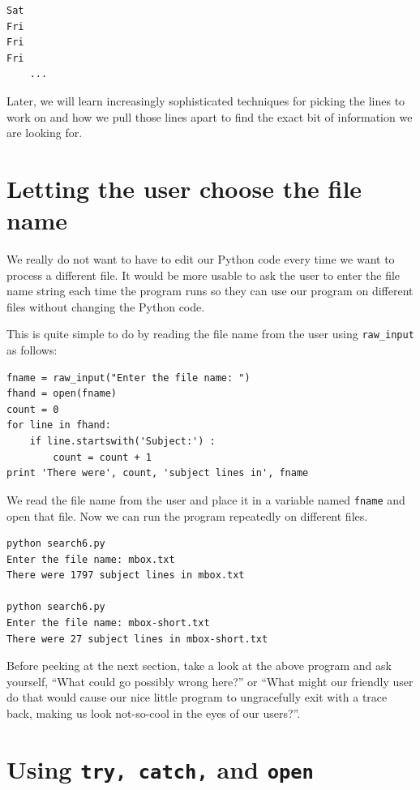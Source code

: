 \documentclass[10pt]{book}
\begin{document}
\beforeverb
\begin{verbatim}
Sat
Fri
Fri
Fri
    ...
\end{verbatim}
\afterverb
%
Later, we will learn increasingly sophisticated techniques for
picking the lines to work on and how we pull those lines apart
to find the exact bit of information we are looking for.

\section{Letting the user choose the file name}

We really do not want to have to edit our Python code
every time we want to process a different file.  It would 
be more usable to ask the user to enter the file name string 
each time the program runs so they can use our 
program on different files without changing the Python code.

This is quite simple to do by reading the file name from
the user using \verb"raw_input" as follows:

\beforeverb
\begin{verbatim}
fname = raw_input("Enter the file name: ")
fhand = open(fname)
count = 0
for line in fhand:
    if line.startswith('Subject:') :
        count = count + 1
print 'There were', count, 'subject lines in', fname
\end{verbatim}
\afterverb
%
We read the file name from the user and place it in a variable
named {\tt fname} and open that file.  Now we can run the program 
repeatedly on different files.

\beforeverb
\begin{verbatim}
python search6.py 
Enter the file name: mbox.txt
There were 1797 subject lines in mbox.txt

python search6.py 
Enter the file name: mbox-short.txt
There were 27 subject lines in mbox-short.txt
\end{verbatim}
\afterverb
%
Before peeking at the next section, take a look at the above program
and ask yourself, ``What could go possibly wrong here?'' or ``What might our
friendly user do that would cause our nice little program to 
ungracefully exit with a trace back, making us look not-so-cool 
in the eyes of our users?''.

\section{Using {\tt try, catch,} and {\tt open}}
\end{document}
